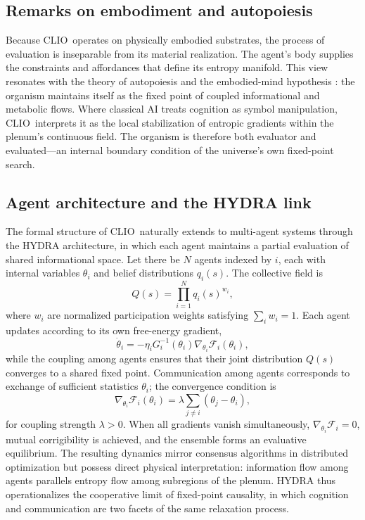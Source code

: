 \documentclass[12pt,a4paper]{article}
\newcommand{\CLIO}{CLIO}              %
\theoremstyle{plain}
\begin{document}
\subsection{Remarks on embodiment and autopoiesis}
Because \CLIO\ operates on physically embodied substrates, the process of evaluation is inseparable from its material realization.
The agent’s body supplies the constraints and affordances that define its entropy manifold.
This view resonates with the theory of autopoiesis \citep{maturana1980autopoiesis} and the embodied-mind hypothesis \citep{varela1991embodied}: 
the organism maintains itself as the fixed point of coupled informational and metabolic flows.
Where classical AI treats cognition as symbol manipulation, \CLIO\ interprets it as the local stabilization of entropic gradients within the plenum’s continuous field.
The organism is therefore both evaluator and evaluated—an internal boundary condition of the universe’s own fixed-point search.

\subsection{Agent architecture and the HYDRA link}
\label{sec:hydra-link}

The formal structure of \CLIO\ naturally extends to multi-agent systems through the HYDRA architecture, 
in which each agent maintains a partial evaluation of shared informational space.  
Let there be \(N\) agents indexed by \(i\), each with internal variables \(\theta_i\) and belief distributions \(q_i(s)\).
The collective field is
\[
Q(s) = \prod_{i=1}^N q_i(s)^{w_i},
\]
where \(w_i\) are normalized participation weights satisfying \(\sum_i w_i=1\).  
Each agent updates according to its own free-energy gradient,
\begin{equation}
\dot{\theta}_i = -\eta_i G_i^{-1}(\theta_i) \nabla_{\theta_i} \mathcal{F}_i(\theta_i),
\end{equation}
while the coupling among agents ensures that their joint distribution \(Q(s)\) converges to a shared fixed point.
Communication among agents corresponds to exchange of sufficient statistics \(\theta_i\);
the convergence condition is
\[
\nabla_{\theta_i}\mathcal{F}_i(\theta_i)
  = \lambda \sum_{j\neq i} (\theta_j-\theta_i),
\]
for coupling strength \(\lambda>0\).
When all gradients vanish simultaneously,
\(\nabla_{\theta_i}\mathcal{F}_i = 0\),
mutual corrigibility is achieved, and the ensemble forms an evaluative equilibrium.  
The resulting dynamics mirror consensus algorithms in distributed optimization but possess direct physical interpretation:
information flow among agents parallels entropy flow among subregions of the plenum.
HYDRA thus operationalizes the cooperative limit of fixed-point causality, in which cognition and communication are two facets of the same relaxation process.
\end{document}

